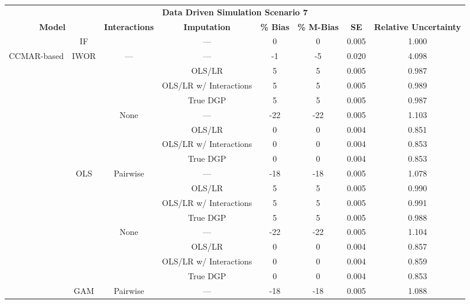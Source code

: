 \begin{table}
\centering
\begin{tabular}[ht]{|>{}c|c|c|c|c|c|c|>{}c|}
\hline
\multicolumn{8}{|c|}{\textbf{Data Driven Simulation Scenario 7}} \\
\cline{1-8}
\multicolumn{2}{|c|}{\textbf{Model}} & \textbf{Interactions} & \textbf{Imputation} & \textbf{\% Bias} & \textbf{\% M-Bias} & \textbf{SE} & \textbf{Relative Uncertainty}\\
\hline
 & IF &  & --- & 0 & 0 & 0.005 & 1.000\\
\cline{2-2}
\cline{4-8}
\multirow{-2}{*}{\centering\arraybackslash CCMAR-based} & IWOR & \multirow{-2}{*}{\centering\arraybackslash ---} & --- & -1 & -5 & 0.020 & 4.098\\
\cline{1-8}
 &  &  & OLS/LR & 5 & 5 & 0.005 & 0.987\\
\cline{4-8}
 &  &  & OLS/LR w/ Interactions & 5 & 5 & 0.005 & 0.989\\
\cline{4-8}
 &  &  & True DGP & 5 & 5 & 0.005 & 0.987\\
\cline{4-8}
 &  & \multirow{-4}{*}{\centering\arraybackslash None} & --- & -22 & -22 & 0.005 & 1.103\\
\cline{3-8}
 &  &  & OLS/LR & 0 & 0 & 0.004 & 0.851\\
\cline{4-8}
 &  &  & OLS/LR w/ Interactions & 0 & 0 & 0.004 & 0.853\\
\cline{4-8}
 &  &  & True DGP & 0 & 0 & 0.004 & 0.853\\
\cline{4-8}
 & \multirow{-8}{*}{\centering\arraybackslash OLS} & \multirow{-4}{*}{\centering\arraybackslash Pairwise} & --- & -18 & -18 & 0.005 & 1.078\\
\cline{2-8}
 &  &  & OLS/LR & 5 & 5 & 0.005 & 0.990\\
\cline{4-8}
 &  &  & OLS/LR w/ Interactions & 5 & 5 & 0.005 & 0.991\\
\cline{4-8}
 &  &  & True DGP & 5 & 5 & 0.005 & 0.988\\
\cline{4-8}
 &  & \multirow{-4}{*}{\centering\arraybackslash None} & --- & -22 & -22 & 0.005 & 1.104\\
\cline{3-8}
 &  &  & OLS/LR & 0 & 0 & 0.004 & 0.857\\
\cline{4-8}
 &  &  & OLS/LR w/ Interactions & 0 & 0 & 0.004 & 0.859\\
\cline{4-8}
 &  &  & True DGP & 0 & 0 & 0.004 & 0.853\\
\cline{4-8}
 & \multirow{-8}{*}{\centering\arraybackslash GAM} & \multirow{-4}{*}{\centering\arraybackslash Pairwise} & --- & -18 & -18 & 0.005 & 1.088\\

\end{tabular}
\end{table}
